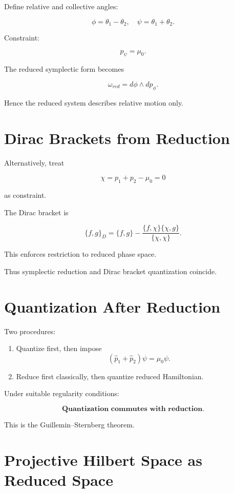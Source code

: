 \documentclass[11pt]{article}
\begin{document}
Define relative and collective angles:

\[
\phi = \theta_1 - \theta_2,
\quad
\psi = \theta_1 + \theta_2.
\]

Constraint:

\[
p_\psi = \mu_0.
\]

The reduced symplectic form becomes

\[
\omega_{red} = d\phi \wedge dp_\phi.
\]

Hence the reduced system describes
relative motion only.

\section{Dirac Brackets from Reduction}

Alternatively, treat

\[
\chi = p_1 + p_2 - \mu_0 = 0
\]

as constraint.

The Dirac bracket is

\[
\{f,g\}_D
=
\{f,g\}
-
\frac{\{f,\chi\}\{\chi,g\}}{\{\chi,\chi\}}.
\]

This enforces restriction to reduced phase space.

Thus symplectic reduction and Dirac bracket quantization coincide.

\section{Quantization After Reduction}

Two procedures:

\begin{enumerate}
\item Quantize first, then impose
\[
(\hat p_1 + \hat p_2)\psi = \mu_0 \psi.
\]

\item Reduce first classically,
then quantize reduced Hamiltonian.
\end{enumerate}

Under suitable regularity conditions:

\[
\textbf{Quantization commutes with reduction}.
\]

This is the Guillemin--Sternberg theorem.

\section{Projective Hilbert Space as Reduced Space}
\end{document}
